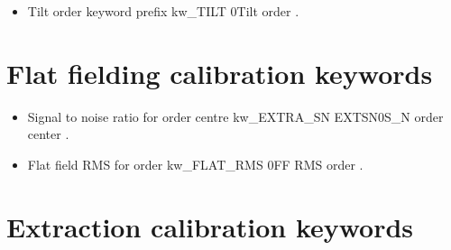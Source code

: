\begin{itemize}

\item {}
{Tilt order keyword prefix}
{kw\_TILT}
{}{0}{Tilt order}
{\calSLIT}{\spirouKeywords}{\calSLIT.\progMAIN}

\end{itemize}





\section{Flat fielding calibration keywords}
\label{ch:output_keywords:flatfielding}

\begin{itemize}

\item {}
{Signal to noise ratio for order centre}
{kw\_EXTRA\_SN}
{EXTSN}{0}{S\_N order center}
{\calFFraw}{\spirouKeywords}{\calFFraw.\progMAIN}


\item {}
{Flat field RMS for order}
{kw\_FLAT\_RMS}
{}{0}{FF RMS order}
{\calFFraw}{\spirouKeywords}{\calFFraw.\progMAIN}

\end{itemize}





\section{Extraction calibration keywords}
\label{ch:output_keywords:extraction}

